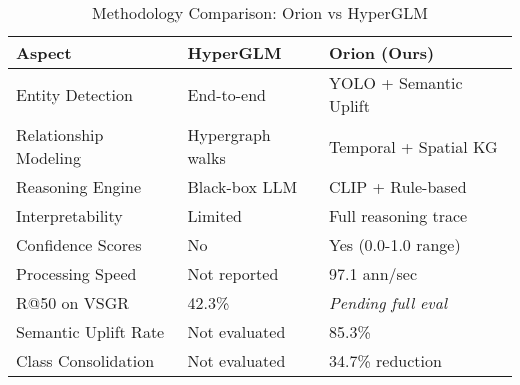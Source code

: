 \begin{table*}[t]
\centering
\caption{Methodology Comparison: Orion vs HyperGLM}
\label{tab:methodology}
\begin{tabular}{lll}
\toprule
\textbf{Aspect} & \textbf{HyperGLM} & \textbf{Orion (Ours)} \\
\midrule
Entity Detection & End-to-end & YOLO + Semantic Uplift \\
Relationship Modeling & Hypergraph walks & Temporal + Spatial KG \\
Reasoning Engine & Black-box LLM & CLIP + Rule-based \\
Interpretability & Limited & Full reasoning trace \\
Confidence Scores & No & Yes (0.0-1.0 range) \\
Processing Speed & Not reported & 97.1 ann/sec \\
\midrule
R@50 on VSGR & 42.3\% & \textit{Pending full eval} \\
Semantic Uplift Rate & Not evaluated & 85.3\% \\
Class Consolidation & Not evaluated & 34.7\% reduction \\
\bottomrule
\end{tabular}
\end{table*}
